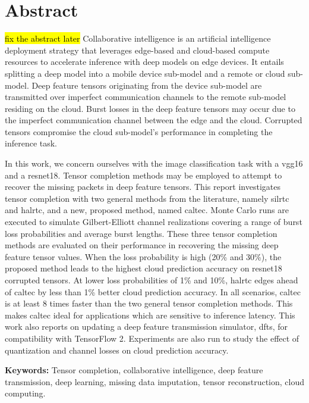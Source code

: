 
\chapter*{Abstract}
\hl{fix the abstract later}
Collaborative intelligence is an artificial intelligence deployment strategy that leverages edge-based and cloud-based compute resources to accelerate inference with deep models on edge devices. It entails splitting a deep model into a mobile device sub-model and a remote or cloud sub-model. Deep feature tensors originating from the device sub-model are transmitted over imperfect communication channels to the remote sub-model residing on the cloud. Burst losses in the deep feature tensors may occur due to the imperfect communication channel between the edge and the cloud. Corrupted tensors compromise the cloud sub-model's performance in completing the inference task.

In this work, we concern ourselves with the image classification task with a \gls{vgg16} and a \gls{resnet18}. Tensor completion methods may be employed to attempt to recover the missing packets in deep feature tensors. This report investigates tensor completion with two general methods from the literature, namely \gls{silrtc} and \gls{halrtc}, and a new, proposed method, named \gls{caltec}. Monte Carlo runs are executed to simulate Gilbert-Elliott channel realizations covering a range of burst loss probabilities and average burst lengths. These three tensor completion methods are evaluated on their performance in recovering the missing deep feature tensor values. When the loss probability is high (20\% and 30\%), the proposed method leads to the highest cloud prediction accuracy on \gls{resnet18} corrupted tensors. At lower loss probabilities of 1\% and 10\%, \gls{halrtc} edges ahead of \gls{caltec} by less than 1\% better cloud prediction accuracy. In all scenarios, \gls{caltec} is at least 8 times faster than the two general tensor completion methods. This makes \gls{caltec} ideal for applications which are sensitive to inference latency. This work also reports on updating a deep feature transmission simulator, \gls{dfts}, for compatibility with TensorFlow 2. Experiments are also run to study the effect of quantization and channel losses on cloud prediction accuracy.

\textbf{Keywords:} Tensor completion, collaborative intelligence, deep feature transmission, deep learning, missing data imputation, tensor reconstruction, cloud computing.


\clearpage
